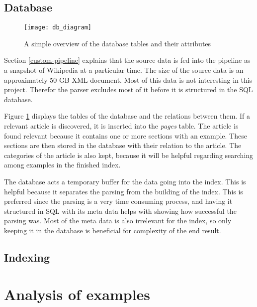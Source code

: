 \subsection{Database}

\begin{figure}[h] 
\caption{A simple overview of the database tables and their attributes}
\texttt{[image: db\_diagram]}
\label{fig:db_diagram}
\end{figure}


Section \ref{custom-pipeline} explains that the source data is fed into the pipeline as a snapshot of Wikipedia at a particular time. The size of the source data is an approximately 50 GB XML-document. Most of this data is not interesting in this project. Therefor the parser excludes most of it before it is structured in the SQL database. 

Figure \ref{fig:db_diagram} displays the tables of the database and the relations between them. If a relevant article is discovered, it is inserted into the \textit{pages} table. The article is found relevant because it contains one or more sections with an example. These sections are then stored in the database with their relation to the article. The categories of the article is also kept, because it will be helpful regarding searching among examples in the finished index.  

The database acts a temporary buffer for the data going into the index. This is helpful because it separates the parsing from the building of the index. This is preferred since the parsing is a very time consuming process, and having it structured in SQL with its meta data helps with showing how successful the parsing was. Most of the meta data is also irrelevant for the index, so only keeping it in the database is beneficial for complexity of the end result.

\subsection{Indexing}

\section{Analysis of examples} %

